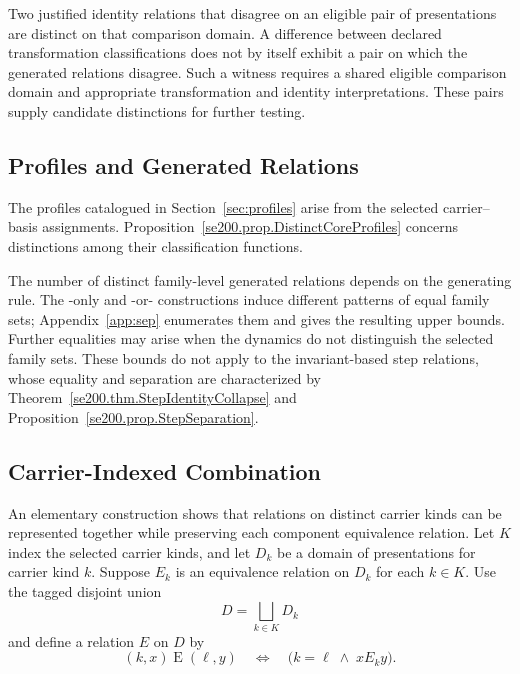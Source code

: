 Two justified identity relations that disagree on an eligible pair
of presentations are distinct on that comparison domain.
A difference between declared transformation classifications does not
by itself exhibit a pair on which the generated relations disagree.
Such a witness requires a shared eligible comparison domain and
appropriate transformation and identity interpretations.
These pairs supply candidate distinctions for further testing.

\subsection{Profiles and Generated Relations}
\label{subsec:profiles_vs_relations}

The profiles catalogued in Section~\ref{sec:profiles}
arise from the selected carrier--basis assignments.
Proposition~\ref{se200.prop.DistinctCoreProfiles} concerns distinctions
among their classification functions.

The number of distinct family-level generated relations
depends on the generating rule.
The \PRS{}-only and \PRS{}-or-\NEU{} constructions
induce different patterns of equal family sets;
Appendix~\ref{app:sep} enumerates them and gives the resulting
upper bounds.
Further equalities may arise when the dynamics do not distinguish
the selected family sets.
These bounds do not apply to the invariant-based step relations,
whose equality and separation are characterized by
Theorem~\ref{se200.thm.StepIdentityCollapse} and
Proposition~\ref{se200.prop.StepSeparation}.

\subsection{Carrier-Indexed Combination}
\label{subsec:amalgamation}

An elementary construction shows that relations on distinct carrier
kinds can be represented together while preserving each component
equivalence relation.
Let $K$ index the selected carrier kinds, and let $D_k$ be a domain
of presentations for carrier kind $k$.
Suppose $E_k$ is an equivalence relation on $D_k$ for each $k\in K$.
Use the tagged disjoint union
\[
D = \bigsqcup_{k\in K} D_k
\]
and define a relation $E$ on $D$ by
\[
(k,x)\mathrel{E}(\ell,y)
\quad\Longleftrightarrow\quad
\bigl(k=\ell \;\wedge\; x\mathrel{E_k} y\bigr).
\]


